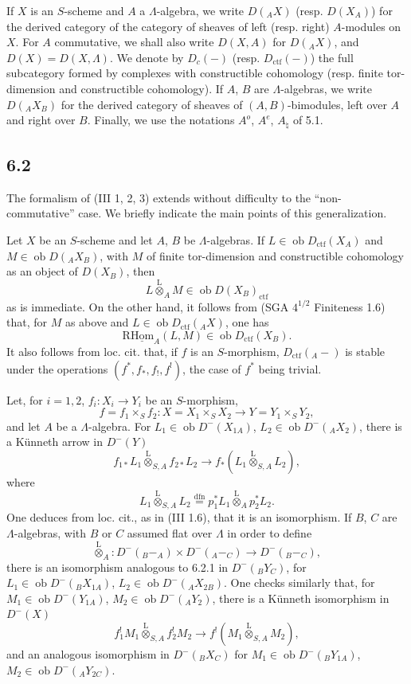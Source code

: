 \documentclass[11pt]{article}
\providecommand{\lten}{\overset{\mathrm L}{\otimes}}
\providecommand{\Ob}{\operatorname{ob}}
\providecommand{\lten}{\overset{\mathrm L}{\otimes}}
\providecommand{\lten}{\overset{\mathrm L}{\otimes}}
\providecommand{\Ob}{\operatorname{ob}}
\providecommand{\lten}{\overset{\mathrm L}{\otimes}}
\providecommand{\lten}{\overset{\mathrm L}{\otimes}}
\providecommand{\Ob}{\operatorname{Ob}}
\providecommand{\lten}{\overset{\mathrm L}{\otimes}}
\providecommand{\Ob}{\operatorname{ob}}
\providecommand{\Ob}{\operatorname{Ob}}
\providecommand{\lten}{\overset{\mathrm L}{\otimes}}
\begin{document}
If $X$ is an $S$-scheme and $A$ a $\Lambda$-algebra, we write $D({}_AX)$ (resp. $D(X_A)$) for the derived category of the category of sheaves of left (resp. right) $A$-modules on $X$. For $A$ commutative, we shall also write $D(X,A)$ for $D({}_AX)$, and $D(X)=D(X,\Lambda)$. We denote by $D_c(-)$ (resp. $D_{\mathrm{ctf}}(-)$) the full subcategory formed by complexes with constructible cohomology (resp. finite tor-dimension and constructible cohomology). If $A$, $B$ are $\Lambda$-algebras, we write $D({}_AX_B)$ for the derived category of sheaves of $(A,B)$-bimodules, left over $A$ and right over $B$. Finally, we use the notations $A^o$, $A^e$, $A_{\natural}$ of 5.1.

\subsection*{6.2}
The formalism of (III 1, 2, 3) extends without difficulty to the “non-commutative” case. We briefly indicate the main points of this generalization.

Let $X$ be an $S$-scheme and let $A$, $B$ be $\Lambda$-algebras. If $L\in\Ob D_{\mathrm{ctf}}(X_A)$ and $M\in\Ob D({}_AX_B)$, with $M$ of finite tor-dimension and constructible cohomology as an object of $D(X_B)$, then
\[
L\lten_A M\in\Ob D(X_B)_{\mathrm{ctf}}
\]
as is immediate. On the other hand, it follows from (SGA $4^{1/2}$ Finiteness 1.6) that, for $M$ as above and $L\in\Ob D_{\mathrm{ctf}}({}_AX)$, one has
\[
\mathrm{R}\underline{\mathrm{Hom}}_A(L,M)\in\Ob D_{\mathrm{ctf}}(X_B).
\]
It also follows from loc. cit. that, if $f$ is an $S$-morphism, $D_{\mathrm{ctf}}({}_A-)$ is stable under the operations $(f^*,f_*,f_!,f^!)$, the case of $f^*$ being trivial.

Let, for $i=1,2$, $f_i:X_i\to Y_i$ be an $S$-morphism,
\[
f=f_1\times_S f_2:X=X_1\times_SX_2\longrightarrow Y=Y_1\times_SY_2,
\]
and let $A$ be a $\Lambda$-algebra. For $L_1\in\Ob D^-(X_{1A})$, $L_2\in\Ob D^-({}_AX_2)$, there is a Künneth arrow in $D^-(Y)$
\begin{equation}
f_{1*}L_1\lten_{S,A}f_{2*}L_2
\longrightarrow
f_*(L_1\lten_{S,A}L_2),
\tag{6.2.1}
\end{equation}
where
\[
L_1\lten_{S,A}L_2
\stackrel{\mathrm{dfn}}{=}p_1^*L_1\lten_Ap_2^*L_2.
\]
One deduces from loc. cit., as in (III 1.6), that it is an isomorphism. If $B$, $C$ are $\Lambda$-algebras, with $B$ or $C$ assumed flat over $\Lambda$ in order to define
\[
\lten_A:D^-({}_B{-}_A)\times D^-({}_A{-}_C)\longrightarrow D^-({}_B{-}_C),
\]
there is an isomorphism analogous to 6.2.1 in $D^-({}_BY_C)$, for $L_1\in\Ob D^-({}_BX_{1A})$, $L_2\in\Ob D^-({}_AX_{2B})$. One checks similarly that, for $M_1\in\Ob D^-(Y_{1A})$, $M_2\in\Ob D^-({}_AY_2)$, there is a Künneth isomorphism in $D^-(X)$
\begin{equation}
f_1^!M_1\lten_{S,A}f_2^!M_2
\longrightarrow
f^!(M_1\lten_{S,A}M_2),
\tag{6.2.2}
\end{equation}
and an analogous isomorphism in $D^-({}_B X_C)$ for $M_1\in\Ob D^-({}_BY_{1A})$, $M_2\in\Ob D^-({}_AY_{2C})$.
\end{document}

